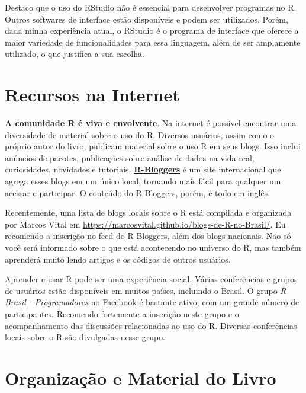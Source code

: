 \documentclass[
  11pt,
]{book}
\begin{document}
Destaco que o uso do RStudio não é essencial para desenvolver programas no R. Outros softwares de interface estão disponíveis e podem ser utilizados. Porém, dada minha experiência atual, o RStudio é o programa de interface que oferece a maior variedade de funcionalidades para essa linguagem, além de ser amplamente utilizado, o que justifica a sua escolha.

\hypertarget{recursos-na-internet}{%
\section{Recursos na Internet}\label{recursos-na-internet}}

\textbf{A comunidade R é viva e envolvente}. Na internet é possível encontrar uma diversidade de material sobre o uso do R. Diversos usuários, assim como o próprio autor do livro, publicam material sobre o uso R em seus blogs. Isso inclui anúncios de pacotes, publicações sobre análise de dados na vida real, curiosidades, novidades e tutoriais. \href{https://www.r-bloggers.com/}{\textbf{R-Bloggers}} é um site internacional que agrega esses blogs em um único local, tornando mais fácil para qualquer um acessar e participar. O conteúdo do R-Bloggers, porém, é todo em inglês.

Recentemente, uma lista de blogs locais sobre o R está compilada e organizada por Marcos Vital em \url{https://marcosvital.github.io/blogs-de-R-no-Brasil/}. Eu recomendo a inscrição no feed do R-Bloggers, além dos blogs nacionais. Não só você será informado sobre o que está acontecendo no universo do R, mas também aprenderá muito lendo artigos e os códigos de outros usuários.

Aprender e usar R pode ser uma experiência social. Várias conferências e grupos de usuários estão disponíveis em muitos países, incluindo o Brasil. O grupo \emph{R Brasil - Programadores} no \href{https://www.facebook.com/groups/1410023525939155/}{Facebook} é bastante ativo, com um grande número de participantes. Recomendo fortemente a inscrição neste grupo e o acompanhamento das discussões relacionadas ao uso do R. Diversas conferências locais sobre o R são divulgadas nesse grupo.

\hypertarget{organizauxe7uxe3o-e-material-do-livro}{%
\section{Organização e Material do Livro}\label{organizauxe7uxe3o-e-material-do-livro}}
\end{document}
